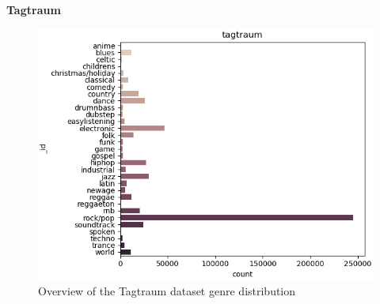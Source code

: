 \textbf{Tagtraum}
\begin{figure}[th]
    \centering
    \includegraphics[width=1.0\textwidth]{Figures/tagtraum_dist.png}
    \decoRule
    \caption[Tagtraum distribution]{Overview of the Tagtraum dataset genre distribution}
    \label{fig:tagtraumdistfig}
\end{figure}
